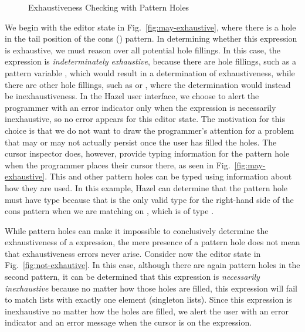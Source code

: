\begin{figure}
{}
\hfil
  \caption{Exhaustiveness Checking with Pattern Holes}
  \label{fig:exhaustiveness}
\end{figure}

We begin with the editor state in Fig.~\ref{fig:may-exhaustive}, 
where there is a hole in the tail position of the cons (\li{::}) pattern.
In determining whether this  expression is exhaustive, we 
must reason over all potential hole fillings. In this case, the 
 expression is \emph{indeterminately exhaustive}, because there are hole fillings,
such as a pattern variable , which would result in a determination
of exhaustiveness, while there are other hole fillings, such as \li{[]} or ,
where the determination would instead be inexhaustiveness. In the Hazel user interface, we choose to alert the programmer with an error
indicator only when the  expression is necessarily inexhaustive,
so no error appears for this editor state. The motivation for this choice is that we do not want to draw the programmer's attention for a problem that may or may not actually persist once the user has filled the holes. The cursor inspector does, however, provide typing information for the pattern hole when the programmer places their cursor there, as seen in Fig.~\ref{fig:may-exhaustive}. This and other pattern holes can be typed using information about how they are used. In this example, Hazel can determine that the pattern hole must have type \li{[Int]} because that is the only valid type for the right-hand side of the cons pattern when we are matching on , which is of type \li{[Int]}.

While pattern holes can make it impossible to conclusively determine the exhaustiveness of a  expression, the mere presence of a pattern hole does not mean that exhaustiveness errors never arise. Consider now
the editor state in Fig.~\ref{fig:not-exhautive}. In this case,
although there are again pattern holes in the second pattern, 
it can be determined that this  expression is \emph{necessarily inexhaustive}
because no matter how those holes are filled, this  expression will fail to 
match lists with exactly one element (singleton lists). Since this  expression is inexhaustive no matter how the holes are filled,
we alert the user with an error indicator and an error message when the cursor is on the  expression.



